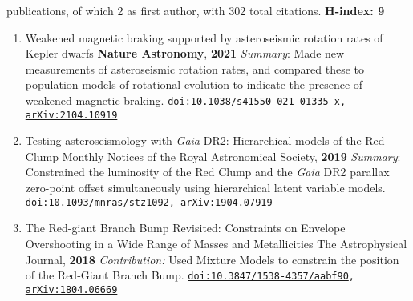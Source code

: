 \documentclass[letterpaper]{k-cv} %
\begin{document}
 publications, of which 2 as first author, with 302 total citations. \textbf{\textcolor{c1}{H-index:} 9}

\textbf{\color{c1}{first \& second author publications:}}
\vspace{-0.2cm}
\begin{enumerate}
	\item {}
	{Weakened magnetic braking supported by asteroseismic rotation rates of Kepler dwarfs}
	{\textbf{\textcolor{c1}{Nature Astronomy}}, \textbf{2021}}
	{\textit{Summary}: Made new measurements of asteroseismic rotation rates, and compared these to population models of rotational evolution to indicate the presence of weakened magnetic braking.}
	{\texttt{\href{https://doi.org/10.1038/s41550-021-01335-x}{doi:10.1038/s41550-021-01335-x}, \href{https://arxiv.org/abs/2104.10919}{arXiv:2104.10919}}}
	
	\item {}
	{Testing asteroseismology with \textit{Gaia} DR2: Hierarchical models of the Red Clump}
	{Monthly Notices of the Royal Astronomical Society, \textbf{2019}}
	{\textit{Summary}: Constrained the luminosity of the Red Clump and the \textit{Gaia} DR2 parallax zero-point offset simultaneously using hierarchical latent variable models.}
	{\texttt{\href{https://academic.oup.com/mnras/article-abstract/486/3/3569/5475128}{doi:10.1093/mnras/stz1092}, \href{https://arxiv.org/abs/1904.07919}{arXiv:1904.07919}}}

	\item {}
{The Red-giant Branch Bump Revisited: Constraints on Envelope Overshooting in a Wide Range of Masses and Metallicities}
{The Astrophysical Journal, \textbf{2018}}
{\textit{Contribution:} Used Mixture Models to constrain the position of the Red-Giant Branch Bump.}
{\texttt{\href{https://iopscience.iop.org/article/10.3847/1538-4357/aabf90}{doi:10.3847/1538-4357/aabf90}, \href{https://arxiv.org/abs/1804.06669}{arXiv:1804.06669}}}
\end{enumerate}
\end{document}
